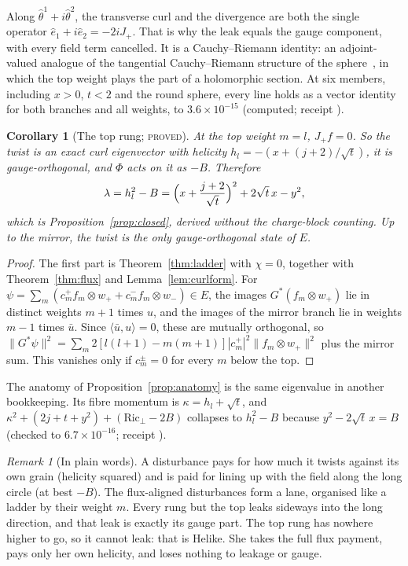 \documentclass[11pt]{article}
\newtheorem{corollary}[theorem]{Corollary}
\theoremstyle{definition}
\theoremstyle{remark}
\newtheorem{remark}[theorem]{Remark}
\newcommand{\norm}[1]{\lVert #1\rVert}
\newcommand{\PROVED}{\textsc{proved}}
\begin{document}
Along $\hat\theta^1+i\hat\theta^2$, the transverse curl and the divergence are both the single operator
$\hat e_1+i\hat e_2=-2iJ_+$. That is why the leak equals the gauge component, with every field term cancelled. It is a
Cauchy--Riemann identity: an adjoint-valued analogue of the tangential Cauchy--Riemann structure of the
sphere~\cite{folland1972}, in which the top weight plays the part of a holomorphic section.
At six members, including $x>0$, $t<2$ and the round sphere, every line holds as a vector identity for both branches and
all weights, to $3.6\times10^{-15}$ (computed; receipt ).

\begin{corollary}[The top rung; \PROVED]\label{cor:toprung}
At the top weight $m=l$, $J_+f=0$. So the twist is an exact curl eigenvector with helicity
$h_l=-(x+(j+2)/\sqrt t)$, it is gauge-orthogonal, and $\Phi$ acts on it as $-B$. Therefore
\[
  \lambda=h_l^2-B=\Bigl(x+\frac{j+2}{\sqrt t}\Bigr)^2+2\sqrt t\,x-y^2 ,
\]
which is Proposition~\ref{prop:closed}, derived without the charge-block counting. Up to the mirror, the twist is the
only gauge-orthogonal state of $E$.
\end{corollary}
\begin{proof}
The first part is Theorem~\ref{thm:ladder} with $\chi=0$, together with Theorem~\ref{thm:flux} and
Lemma~\ref{lem:curlform}. For $\psi=\sum_m(c_m^+f_m\otimes w_++c_m^-f_m\otimes w_-)\in E$, the images $G^*(f_m\otimes w_+)$
lie in distinct weights $m+1$ times $u$, and the images of the mirror branch lie in weights $m-1$ times $\bar u$. Since
$\langle\bar u,u\rangle=0$, these are mutually orthogonal, so
$\norm{G^*\psi}^2=\sum_m2[l(l+1)-m(m+1)]|c_m^+|^2\norm{f_m\otimes w_+}^2$ plus the mirror sum. This vanishes only if
$c_m^\pm=0$ for every $m$ below the top.
\end{proof}

The anatomy of Proposition~\ref{prop:anatomy} is the same eigenvalue in another bookkeeping. Its fibre momentum is
$\kappa=h_l+\sqrt t$, and $\kappa^2+(2j+t+y^2)+(\mathrm{Ric}_\perp-2B)$ collapses to $h_l^2-B$ because $y^2-2\sqrt t\,x=B$
(checked to $6.7\times10^{-16}$; receipt ).

\begin{remark}[In plain words]\label{rem:ladderwords}
A disturbance pays for how much it twists against its own grain (helicity squared) and is paid for lining up with the
field along the long circle (at best $-B$). The flux-aligned disturbances form a lane, organised like a ladder by their
weight $m$. Every rung but the top leaks sideways into the long direction, and that leak is exactly its gauge part.
The top rung has nowhere higher to go, so it cannot leak: that is Helike. She takes the full flux payment, pays only
her own helicity, and loses nothing to leakage or gauge.
\end{remark}
\end{document}
